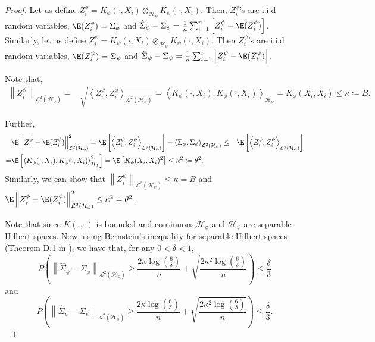 \documentclass{article} %
\newcommand{\HS}{\mathcal{L}^{2}}
\newcommand{\repone}{\phi}
\newcommand{\reptwo}{\psi}
\newcommand{\Hone}{\mathcal{H}_{\phi}}
\newcommand{\Htwo}{\mathcal{H}_{\psi}}
\newcommand{\norm}[1]{\left\|#1\right\|}
\newcommand{\inprod}[1]{\left \langle #1 \right\rangle}
\theoremstyle{plain}
\begin{document}
\begin{proof}
Let us define $Z_{i}^{\repone} = K_{\repone}(\cdot,X_{i})\otimes_{\Hone}K_{\repone}(\cdot,X_{i})$. Then, $Z_{i}^{\repone}$'s are i.i.d random variables, $\E(Z_{i}^{\repone}) = \Sigma_{\repone}$ and $\hat{\Sigma}_{\repone} - \Sigma_{\repone} = \frac{1}{n}\sum_{i=1}^{n}\left[Z_{i}^{\repone}-\E(Z_{i}^{\repone})\right]$. Similarly, let us define $Z_{i}^{\reptwo} = K_{\reptwo}(\cdot,X_{i})\otimes_{\Htwo}K_{\reptwo}(\cdot,X_{i})$. Then $Z_{i}^{\reptwo}$'s are i.i.d random variables, $\E(Z_{i}^{\reptwo}) = \Sigma_{\reptwo}$ and $\hat{\Sigma}_{\reptwo} - \Sigma_{\reptwo} = \frac{1}{n}\sum_{i=1}^{n}\left[Z_{i}^{\reptwo}-\E(Z_{i}^{\reptwo})\right]$.

Note that,
\[
\begin{aligned}
    \norm{Z_{i}^{\repone}}_{\HS(\Hone)}    =&\sqrt{\inprod{Z_{i}^{\repone},Z_{i}^{\repone}}_{\HS(\Hone)}}
    =\inprod{K_{\repone}(\cdot,X_{i}),K_{\repone}(\cdot,X_{i})}_{\Hone}
    =K_{\repone}(X_{i},X_{i})
    \leq \kappa \coloneq B.
\end{aligned}
\]

Further, 
\[
\begin{aligned}
   &\E\norm{Z_{i}^{\repone}-\E(Z_{i}^{\repone})}_{\HS(\Hone)}^{2}
   =\E\left[\inprod{Z_{i}^{\repone},Z_{i}^{\repone}}_{\HS(\Hone)}\right] - \inprod{\Sigma_{\repone},\Sigma_{\repone}}_{\HS(\Hone)}
   \leq& \E\left[\inprod{Z_{i}^{\repone},Z_{i}^{\repone}}_{\HS(\Hone)}\right]\\
   =&\E\left[\inprod{K_{\repone}(\cdot,X_{i}),K_{\repone}(\cdot,X_{i})}_{\Hone}^{2}\right]
   =\E\left[K_{\repone}(X_{i},X_{i})^{2}\right]
   \leq \kappa^{2} \coloneq \theta^{2}.
\end{aligned}
\]
Similarly, we can show that $\norm{Z_{i}^{\reptwo}}_{\HS(\Htwo)}\leq \kappa = B$ and $\E\norm{Z_{i}^{\repone}-\E(Z_{i}^{\repone})}_{\HS(\Hone)}^{2}\leq \kappa^{2} = \theta^{2}$.

Note that since $K(\cdot,\cdot)$ is bounded and continuous,$\Hone$ and $\Htwo$ are separable Hilbert spaces. Now, using Bernstein's inequality for separable Hilbert spaces (Theorem D.1 in \citet{sriperumbudur2022approximate}), we have that, for any $0<\delta<1$,
\[
P\left(\norm{\hat{\Sigma}_{\repone}-\Sigma_{\repone}}_{\HS(\Hone)} \geq \frac{2\kappa\log(\frac{6}{\delta})}{n} + \sqrt{\frac{2\kappa^{2}\log(\frac{6}{\delta})}{n}}\right) \leq \frac{\delta}{3}
\]
and 
\[
P\left(\norm{\hat{\Sigma}_{\reptwo}-\Sigma_{\reptwo}}_{\HS(\Hone)} \geq \frac{2\kappa\log(\frac{6}{\delta})}{n} + \sqrt{\frac{2\kappa^{2}\log(\frac{6}{\delta})}{n}}\right) \leq \frac{\delta}{3}.
\]


\end{proof}
\end{document}
